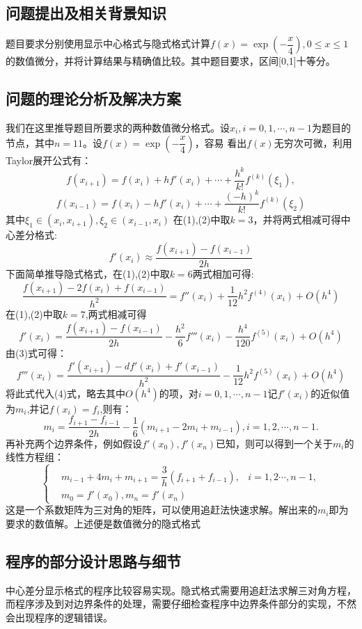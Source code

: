 \documentclass[10pt,a4paper]{ctexart}
\begin{document}
\subsection{问题提出及相关背景知识}
题目要求分别使用显示中心格式与隐式格式计算$f(x)=\exp(-\dfrac{x}{4}),0\leq x \leq 1$的数值微分，并将计算结果与精确值比较。其中题目要求，区间[0,1]十等分。
\subsection{问题的理论分析及解决方案}
我们在这里推导题目所要求的两种数值微分格式。设$x_i,i=0,1,\cdots,n-1$为题目的节点，其中$n=11$。设$f(x)=\exp(-\dfrac{x}{4})$，容易
看出$f(x)$无穷次可微，利用Taylor展开公式有：
\begin{equation} f(x_{i+1})=f(x_i)+hf'(x_i)+\cdots+\dfrac{h^k}{k!}f^{(k)}(\xi_1),
\end{equation} 
\begin{equation} f(x_{i-1})=f(x_i)-hf'(x_i)+\cdots+\dfrac{(-h)^{k}}{k!}f^{(k)}(\xi_2)\end{equation}
其中$\xi_1 \in (x_i,x_{i+1}),\xi_2 \in (x_{i-1},x_i)$
在(1),(2)中取$k=3$，并将两式相减可得中心差分格式:
\[f'(x_i)\approx \dfrac{f(x_{i+1})-f(x_{i-1})}{2h}\]
下面简单推导隐式格式，在(1),(2)中取$k=6$两式相加可得:
\begin{equation}
\dfrac{f(x_{i+1})-2f(x_i)+f(x_{i-1})}{h^2}=f''(x_i)+\dfrac{1}{12}h^2f^{(4)}(x_i)+O(h^4)
\end{equation}
在(1),(2)中取$k=7$,两式相减可得
\begin{equation}
f'(x_i)=\dfrac{f(x_{i+1})-f(x_{i-1})}{2h}-\dfrac{h^2}{6}f'''(x_i)-\dfrac{h^4}{120}f^{(5)}(x_i)+O(h^4)
\end{equation}
由(3)式可得：
\[f'''(x_i)=\dfrac{f'(x_{i+1})-df'(x_i)+f'(x_{i-1})}{h^2}-\dfrac{1}{12}h^2f^{(5)}(x_i)+O(h^4)\]
将此式代入(4)式，略去其中$O(h^4)$的项，对$i=0,1,\cdots,n-1$记$f'(x_i)$的近似值为$m_i$,并记$f(x_i)=f_i$,则有：
\[ m_i=\dfrac{f_{i+1}-f_{i-1}}{2h}-\dfrac{1}{6}(m_{i+1}-2m_i+m_{i-1}),i=1,2,\cdots,n-1.\]
再补充两个边界条件，例如假设$f'(x_0),f'(x_n)$已知，则可以得到一个关于$m_i$的线性方程组：
$$\left\{\begin{aligned}
& m_{i-1}+4m_i+m_{i+1}=\dfrac{3}{h}(f_{i+1}+f_{i-1}),&i=1,2\cdots,n-1, \\
& m_0=f'(x_0),m_n=f'(x_n)
\end{aligned}
\right.
$$
这是一个系数矩阵为三对角的矩阵，可以使用追赶法快速求解。解出来的$m_i$即为要求的数值解。上述便是数值微分的隐式格式
\subsection{程序的部分设计思路与细节}
中心差分显示格式的程序比较容易实现。隐式格式需要用追赶法求解三对角方程，而程序涉及到对边界条件的处理，需要仔细检查程序中边界条件部分的实现，不然会出现程序的逻辑错误。
\end{document}
